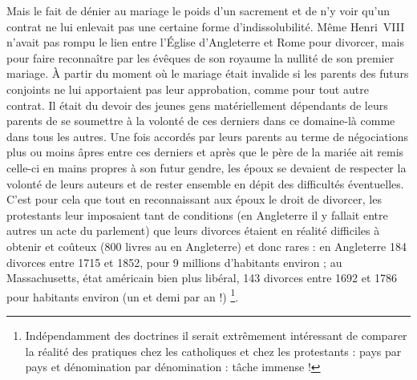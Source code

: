  
 Mais le fait de dénier au mariage le poids d'un sacrement et de n'y voir qu'un contrat ne lui enlevait pas une certaine forme d'indissolubilité. Même Henri~VIII n'avait pas rompu le lien entre l'Église d'Angleterre et Rome pour divorcer, mais pour faire reconnaître par les évêques de son royaume la nullité de son premier mariage. À partir du moment où le mariage était invalide si les parents des futurs conjoints ne lui apportaient pas leur approbation, comme pour tout autre contrat. Il était du devoir des jeunes gens matériellement dépendants de leurs parents de se soumettre à la volonté de ces derniers dans ce domaine-là comme dans tous les autres. Une fois accordés par leurs parents au terme de négociations plus ou moins âpres entre ces derniers et après que le père de la mariée ait remis celle-ci en mains propres à son futur gendre, les époux se devaient de respecter la volonté de leurs auteurs et de rester ensemble en dépit des difficultés éventuelles. C'est pour cela que tout en reconnaissant aux époux le droit de divorcer, les protestants leur imposaient tant de conditions (en Angleterre il y fallait entre autres un acte du parlement) que leurs divorces étaient en réalité difficiles à obtenir et coûteux (800 livres au  en Angleterre) et donc rares : en Angleterre 184 divorces entre 1715 et 1852, pour 9 millions d'habitants environ ; au Massachusetts, état américain bien plus libéral, 143 divorces entre 1692 et 1786 pour  habitants environ (un et demi par an !) 
 \footnote{Indépendamment des doctrines il serait extrêmement intéressant de comparer la réalité des pratiques chez les catholiques et chez les protestants : pays par pays et dénomination par dénomination : tâche immense !}. 


 